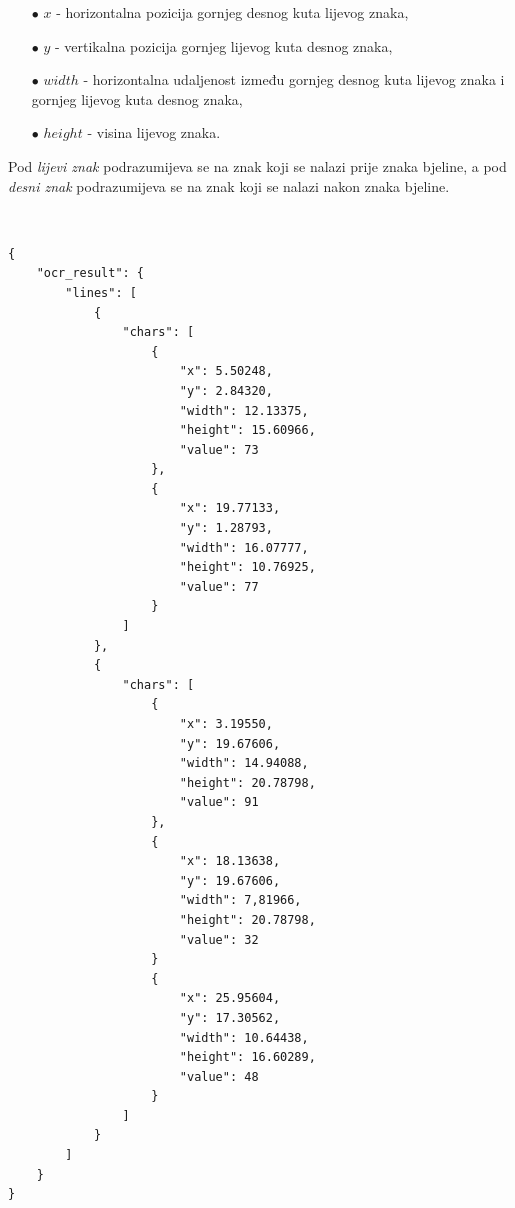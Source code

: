 \documentclass[times, utf8, zavrsni]{fer}
\begin{document}
\begin{itemize}
    \item[$\bullet$] $x$ - horizontalna pozicija gornjeg desnog kuta lijevog znaka,
    \item[$\bullet$] $y$ - vertikalna pozicija gornjeg lijevog kuta desnog znaka,
    \item[$\bullet$] $width$ - horizontalna udaljenost između gornjeg desnog kuta lijevog
                               znaka i gornjeg lijevog kuta desnog znaka,
    \item[$\bullet$] $height$ - visina lijevog znaka.
\end{itemize}

Pod \emph{lijevi znak} podrazumijeva se na znak koji se nalazi prije znaka bjeline, a pod
\emph{desni znak} podrazumijeva se na znak koji se nalazi nakon znaka bjeline.

\

\begin{lstlisting}[caption={Primjer izlaza iz sustava za određivanje strukture teksta.},label={lst:ocr-result-json-02}]
{
    "ocr_result": {
        "lines": [
            {
                "chars": [
                    {
                        "x": 5.50248,
                        "y": 2.84320,
                        "width": 12.13375,
                        "height": 15.60966,
                        "value": 73
                    },
                    {
                        "x": 19.77133,
                        "y": 1.28793,
                        "width": 16.07777,
                        "height": 10.76925,
                        "value": 77
                    }
                ]
            },
            {
                "chars": [
                    {
                        "x": 3.19550,
                        "y": 19.67606,
                        "width": 14.94088,
                        "height": 20.78798,
                        "value": 91
                    },
                    {
                        "x": 18.13638,
                        "y": 19.67606,
                        "width": 7,81966,
                        "height": 20.78798,
                        "value": 32
                    }
                    {
                        "x": 25.95604,
                        "y": 17.30562,
                        "width": 10.64438,
                        "height": 16.60289,
                        "value": 48
                    }
                ]
            }
        ]
    }
}
\end{lstlisting}
\end{document}
